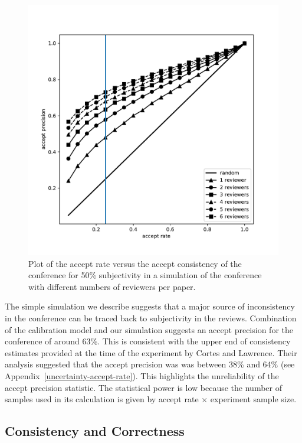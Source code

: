 \documentclass[twoside]{article}
\begin{document}
\begin{figure}[htb]
\includegraphics[width=0.90\columnwidth]{diagrams/neurips/accept-precision-vs-accept-rate.pdf}

\caption{Plot of the accept rate versus the accept consistency of the
  conference for 50\% subjectivity in a simulation of the conference
  with different numbers of reviewers per paper.}
\label{figure-consistency-vs-accept-rate}
\end{figure}

The simple simulation we describe suggests that a major source of
inconsistency in the conference can be traced back to subjectivity in
the reviews. Combination of the calibration model and our simulation
suggests an accept precision for the conference of around 63\%. This
is consistent with the upper end of consistency estimates provided at
the time of the experiment by Cortes and Lawrence. Their analysis
suggested that the accept precision was was between 38\% and 64\% (see
Appendix~\ref{uncertainty-accept-rate}). This highlights the
unreliability of the accept precision statistic. The statistical power
is low because the number of samples used in its calculation is given
by accept rate $\times$ experiment sample size.

\subsection{Consistency and Correctness}
\end{document}
